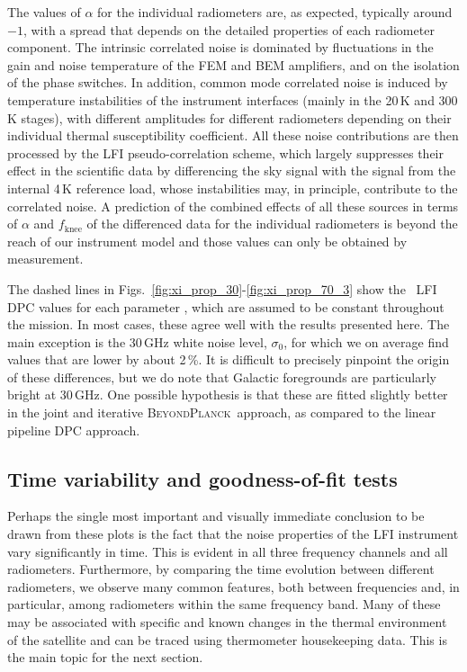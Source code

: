 \documentclass{aa}
\newcommand{\BP}{\textsc{BeyondPlanck}}
\begin{document}
The values of $\alpha$ for the individual radiometers are, as expected,
typically around $-1$, with a spread that depends
on the detailed properties of each radiometer component. The
intrinsic correlated noise is dominated by fluctuations in the gain
and noise temperature of the FEM and BEM amplifiers, and on the
isolation of the phase switches. In addition, common mode correlated
noise is induced by temperature instabilities of the instrument
interfaces (mainly in the 20\,K and 300\,K stages), with different amplitudes for
different radiometers depending on their individual thermal
susceptibility coefficient. All these noise contributions are then
processed by the LFI pseudo-correlation scheme, which largely
suppresses their effect in the scientific data by differencing the sky
signal with the signal from the internal 4\,K reference load, whose
instabilities may, in principle, contribute to the correlated noise. A
prediction of the combined effects of all these sources in terms of
$\alpha$ and $f_{\mathrm{knee}}$ of the differenced data for the individual
radiometers is beyond the reach of our instrument model and those
values can only be obtained by measurement.

The dashed lines in Figs.~\ref{fig:xi_prop_30}-\ref{fig:xi_prop_70_3}
show the \Planck\ LFI DPC values for each parameter
\citep{planck2016-l02}, which are assumed to be constant throughout
the mission. In most cases, these agree well with the results
presented here. The main exception is the 30\,GHz white noise level,
$\sigma_0$, for which we on average find values that are lower by about 2\,\%. It is
difficult to precisely pinpoint the origin of these differences, but
we do note that Galactic foregrounds are particularly bright at
30\,GHz. One possible hypothesis is that these are fitted
slightly better in the joint and iterative \BP\ approach, as compared
to the linear pipeline DPC approach.

\subsection{Time variability and goodness-of-fit tests}
\label{sec:time_variability}
Perhaps the single most important and visually immediate conclusion to be drawn
from these plots is the fact that the noise properties of the LFI
instrument vary significantly in time. This is evident in all three
frequency channels and all radiometers. Furthermore, by comparing the
time evolution between different radiometers, we observe many common
features, both between frequencies and, in particular, among
radiometers within the same frequency band. Many of these may be associated
with specific and known changes in the thermal environment of the
satellite and can be traced using thermometer housekeeping data. This is
the main topic for the next section.
\end{document}
